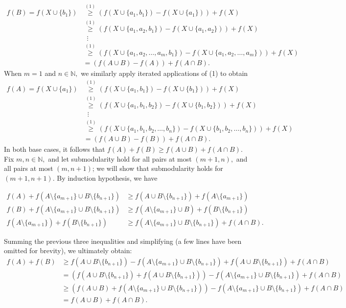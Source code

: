 \documentclass{article}
\begin{document}
\begin{align*}
    f(B)=f(X\cup \{b_1\})&\overset{(1)}{\geq} \left(f(X\cup \{a_1,b_1\})-f(X\cup \{a_1\})\right)+f(X)\\&\overset{(1)}{\geq}\left(f(X\cup \{a_1,a_2,b_1\})-f(X\cup \{a_1,a_2\})\right)+f(X)\\& \;\; \vdots \\& \overset{(1)}{\geq}\left(f(X\cup \{a_1,a_2,\dots,a_m,b_1\})-f(X\cup \{a_1,a_2,\dots,a_m\})\right)+f(X)\\&=\left(f(A\cup B)-f(A)\right)+f(A\cap B).
\end{align*}
When $m=1$ and $n\in \mathbb{N},$ we similarly apply iterated applications of (1) to obtain
\begin{align*}
    f(A)=f(X\cup \{a_1\})&\overset{(1)}{\geq} \left(f(X\cup \{a_1,b_1\})-f(X\cup \{b_1\})\right)+f(X)\\&\overset{(1)}{\geq}\left(f(X\cup \{a_1,b_1,b_2\})-f(X\cup \{b_1,b_2\})\right)+f(X)\\& \;\; \vdots \\& \overset{(1)}{\geq}\left(f(X\cup \{a_1,b_1,b_2,\dots,b_n\})-f(X\cup \{b_1,b_2,\dots,b_n\})\right)+f(X)\\&=\left(f(A\cup B)-f(B)\right)+f(A\cap B).
\end{align*}
In both base cases, it follows that $f(A)+f(B)\geq f(A\cup B)+f(A\cap B).$ Fix $m,n\in \mathbb{N},$ and let submodularity hold for all pairs at most $(m+1,n),$ and all pairs at most $(m,n+1)$; we will show that submodularity holds for $(m+1,n+1).$ By induction hypothesis, we have

\begin{align*}
    f(A)+f(A\setminus \{a_{m+1}\}\cup B\setminus \{b_{n+1}\}) & \geq f(A\cup B\setminus \{b_{n+1}\})+f(A\setminus \{a_{m+1}\}) \\
    f(B) +f(A\setminus \{a_{m+1}\}\cup B\setminus \{b_{n+1}\})& \geq f(A\setminus \{a_{m+1}\}\cup B)+f(B\setminus \{b_{n+1}\}) \\
    f(A\setminus \{a_{m+1}\})+f(B\setminus \{b_{n+1}\})& \geq f(A\setminus \{a_{m+1}\}\cup B\setminus \{b_{n+1}\})+f(A\cap B).
\end{align*}

Summing the previous three inequalities and simplifying (a few lines have been omitted for brevity), we ultimately obtain:
\begin{align*}
    f(A)+f(B) &\geq f(A\cup B\setminus \{b_{n+1}\})-f(A\setminus \{a_{m+1}\}\cup B\setminus \{b_{n+1}\})+f(A\cup B\setminus \{b_{n+1}\})+f(A\cap B)\\& = \left(f(A\cup B\setminus \{b_{n+1}\})+f(A\cup B\setminus \{b_{n+1}\})\right)-f(A\setminus \{a_{m+1}\}\cup B\setminus \{b_{n+1}\})+f(A\cap B)\\& \geq \left(f(A\cup B)+f(A\setminus \{a_{m+1}\}\cup B\setminus \{b_{n+1}\})\right)-f(A\setminus \{a_{m+1}\}\cup B\setminus \{b_{n+1}\})+f(A\cap B)\\&=f(A\cup B)+f(A\cap B).
\end{align*}
\end{document}
